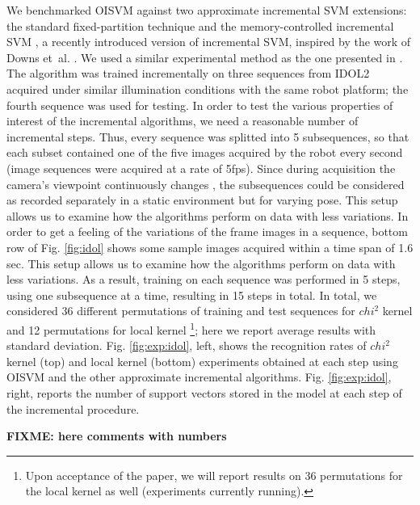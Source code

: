 We benchmarked  OISVM against two approximate incremental SVM extensions: the
standard fixed-partition technique \cite{syed99incremental} and the memory-controlled
incremental SVM \cite{luo:icra07}, a recently introduced version of incremental
SVM, inspired by the work of Downs et~al. \cite{DownsGM01}. We used a similar
experimental method as the one presented in \cite{luo:icra07}. The algorithm was
trained incrementally on three sequences from IDOL2 acquired under similar
illumination conditions with the same robot platform; the fourth sequence was
used for testing. In order to test the various properties of interest of the
incremental algorithms, we need a reasonable number of incremental steps.
Thus, every sequence was splitted into 5 subsequences, so that each subset 
contained one of the five images acquired by the robot every second (image
sequences were acquired at a rate of 5fps). Since during acquisition the camera's
viewpoint continuously changes \cite{luo:icra07}, the subsequences could be
considered as recorded separately in a static environment but for varying pose.
This setup allows us to examine how the algorithms perform on data with less
variations. In order to get a feeling of the variations of the frame images in a
sequence, bottom row of Fig. \ref{fig:idol} shows some sample images acquired
within a time span of 1.6 sec. This setup allows us to examine how the algorithms
perform on data with less variations. As a result, training on each sequence was
performed in 5 steps, using one subsequence at a time, resulting in 15 steps in 
total. In total, we considered 36 different permutations of training and test
sequences for $chi^2$ kernel and 12 permutations for local kernel 
\footnote{Upon acceptance of the paper, we will report results
on 36 permutations for the local kernel as well (experiments currently running).}; 
here we report average results with standard deviation. 
Fig. \ref{fig:exp:idol}, left, shows the recognition rates of $chi^2$ kernel (top)
and local kernel (bottom) experiments obtained at each step using OISVM and the
other approximate incremental algorithms. Fig. \ref{fig:exp:idol}, right, reports
the number of support vectors stored in the model at each step of the incremental
procedure.

\textbf{FIXME: here comments with numbers}


